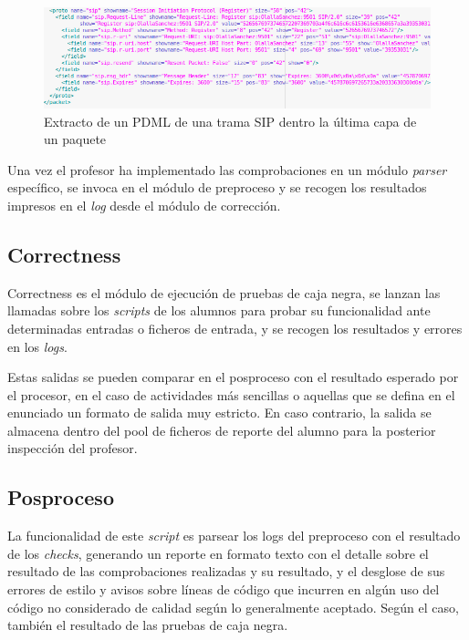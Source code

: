 \begin{figure}[H]
   \centering
   \includegraphics[width=16cm]{img/Selection_015_pdml_2}
   \caption{Extracto de un PDML de una trama SIP dentro la última capa de un paquete}
   \label{figura:extracto_pdml}
\end{figure}


Una vez el profesor ha implementado las comprobaciones en un módulo \textit{parser} específico, se invoca en el módulo de preproceso y se recogen los resultados impresos en el \textit{log} desde el módulo de corrección.


\subsection{Correctness}
\label{sec:correctness}


Correctness es el módulo de ejecución de pruebas de caja negra, se lanzan las llamadas sobre los \textit{scripts} de los alumnos para probar su funcionalidad ante determinadas entradas o ficheros de entrada, y se recogen los resultados y errores en los \textit{logs}.


Estas salidas se pueden comparar en el posproceso con el resultado esperado por el procesor, en el caso de actividades más sencillas o aquellas que se defina en el enunciado un formato de salida muy estricto. En caso contrario, la salida se almacena dentro del pool de ficheros de reporte del alumno para la posterior inspección del profesor.


\subsection{Posproceso}
\label{sec:posproceso}


La funcionalidad de este \textit{script} es parsear los logs del preproceso con el resultado de los \textit{checks}, generando un reporte en formato texto con el detalle sobre el resultado de las comprobaciones realizadas y su resultado, y el desglose de sus errores de estilo y avisos sobre líneas de código que incurren en algún uso del código no considerado de calidad según lo generalmente aceptado. Según el caso, también el resultado de las pruebas de caja negra.


